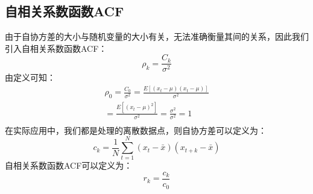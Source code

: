 \documentclass{article}
\begin{document}
\subsection{自相关系数函数ACF}
由于自协方差的大小与随机变量的大小有关，无法准确衡量其间的关系，因此我们引入自相关系数函数ACF：
\begin{equation}
\rho _{k} = \frac{C_{k}}{\sigma ^{2}}
\label{e000013}
\end{equation}
由定义可知：
\begin{equation}
\begin{aligned}
\rho _{0} = \frac{C_{0}}{\sigma ^{2}} = \frac{E[(x_{t} - \mu)(x_{t} - \mu)]}{\sigma ^{2}} \\
= \frac{E[(x_{t} - \mu)^{2}]}{\sigma ^{2}} = \frac{\sigma ^{2}}{\sigma ^{2}} = 1\\
\end{aligned}
\label{e000014}
\end{equation}
在实际应用中，我们都是处理的离散数据点，则自协方差可以定义为：
\begin{equation}
c_{k}=\frac{1}{N}\sum_{t=1}^{N}(x_{t}-\bar{x})(x_{t+k} - \bar{x})
\label{e000015}
\end{equation}
自相关系数函数ACF可以定义为：
\begin{equation}
r_{k}=\frac{c_{k}}{c_{0}}
\label{e000016}
\end{equation}
\end{document}
